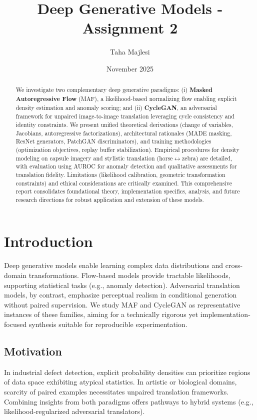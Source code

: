 \documentclass[11pt]{article}
\title{Deep Generative Models - Assignment 2}
\author{Taha Majlesi}
\date{November 2025}
\begin{document}
\maketitle

\begin{abstract}
We investigate two complementary deep generative paradigms: (i) \textbf{Masked Autoregressive Flow} (MAF), a likelihood-based normalizing flow enabling explicit density estimation and anomaly scoring; and (ii) \textbf{CycleGAN}, an adversarial framework for unpaired image-to-image translation leveraging cycle consistency and identity constraints. We present unified theoretical derivations (change of variables, Jacobians, autoregressive factorizations), architectural rationales (MADE masking, ResNet generators, PatchGAN discriminators), and training methodologies (optimization objectives, replay buffer stabilization). Empirical procedures for density modeling on capsule imagery and stylistic translation (horse$\leftrightarrow$zebra) are detailed, with evaluation using AUROC for anomaly detection and qualitative assessments for translation fidelity. Limitations (likelihood calibration, geometric transformation constraints) and ethical considerations are critically examined. This comprehensive report consolidates foundational theory, implementation specifics, analysis, and future research directions for robust application and extension of these models.
\end{abstract}

\section{Introduction}
Deep generative models enable learning complex data distributions and cross-domain transformations. Flow-based models provide tractable likelihoods, supporting statistical tasks (e.g., anomaly detection). Adversarial translation models, by contrast, emphasize perceptual realism in conditional generation without paired supervision. We study MAF and CycleGAN as representative instances of these families, aiming for a technically rigorous yet implementation-focused synthesis suitable for reproducible experimentation.

\subsection{Motivation}
In industrial defect detection, explicit probability densities can prioritize regions of data space exhibiting atypical statistics. In artistic or biological domains, scarcity of paired examples necessitates unpaired translation frameworks. Combining insights from both paradigms offers pathways to hybrid systems (e.g., likelihood-regularized adversarial translators).
\end{document}
